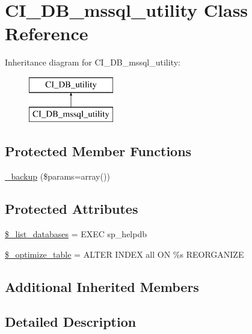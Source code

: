 \hypertarget{class_c_i___d_b__mssql__utility}{}\section{C\+I\+\_\+\+D\+B\+\_\+mssql\+\_\+utility Class Reference}
\label{class_c_i___d_b__mssql__utility}
Inheritance diagram for C\+I\+\_\+\+D\+B\+\_\+mssql\+\_\+utility\+:\begin{figure}[H]
\begin{center}
\leavevmode
\includegraphics[height=2.000000cm]{class_c_i___d_b__mssql__utility}
\end{center}
\end{figure}
\subsection*{Protected Member Functions}
\begin{DoxyCompactItemize}
\item 
\mbox{\hyperlink{class_c_i___d_b__mssql__utility_a30f3053d2c82e7562349924363507afa}{\+\_\+backup}} (\$params=array())
\end{DoxyCompactItemize}
\subsection*{Protected Attributes}
\begin{DoxyCompactItemize}
\item 
\mbox{\hyperlink{class_c_i___d_b__mssql__utility_afe3a5b80562d93d6bc7e2b53c95b7e5a}{\$\+\_\+list\+\_\+databases}} = \textquotesingle{}E\+X\+EC sp\+\_\+helpdb\textquotesingle{}
\item 
\mbox{\hyperlink{class_c_i___d_b__mssql__utility_a083199e5c22c78912dae0a47bb2d7fad}{\$\+\_\+optimize\+\_\+table}} = \textquotesingle{}A\+L\+T\+ER I\+N\+D\+EX all ON \%s R\+E\+O\+R\+G\+A\+N\+I\+ZE\textquotesingle{}
\end{DoxyCompactItemize}
\subsection*{Additional Inherited Members}


\subsection{Detailed Description}


